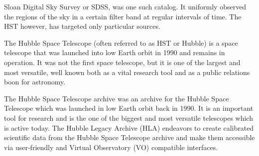 \documentclass[12pt, letterpaper]{article}
\begin{document}
Sloan Digital Sky Survey or SDSS, was one such catalog. It uniformly observed the regions of the sky in a certain filter band at regular intervals of time. The HST however, has targeted only particular sources.

The Hubble Space Telescope (often referred to as HST or Hubble) is a space telescope that was launched into low Earth orbit in 1990 and remains in operation. It was not the first space telescope, but it is one of the largest and most versatile, well known both as a vital research tool and as a public relations boon for astronomy.

The Hubble Space Telescope archive was an archive for the Hubble Space Telescope which was launched in low Earth orbit back in 1990. It is an important tool for research and is the one of the biggest and most versatile telescopes which is active today.
The Hubble Legacy Archive (HLA) endeavors to create calibrated scientific data from the Hubble Space Telescope archive and make them accessible via user-friendly and Virtual Observatory (VO) compatible interfaces. 
\end{document}
